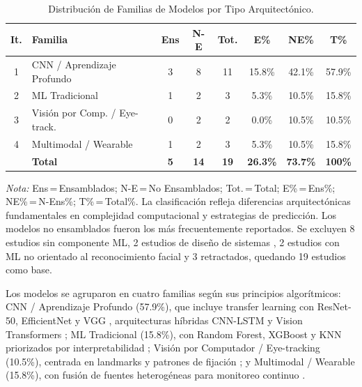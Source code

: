 \documentclass[3p,twocolumn,times]{elsarticle}
\begin{document}
	\begin{table}[!ht]
		\centering
		\caption{Distribución de Familias de Modelos por Tipo Arquitectónico.}\label{tab7}
		\begin{tabular}{clcccccc}
			\toprule
			\textbf{It.} & \textbf{Familia} & \textbf{Ens} & \textbf{N-E} & \textbf{Tot.} &
			\textbf{E\%} & \textbf{NE\%} & \textbf{T\%} \\
			\midrule
			1 & CNN / Aprendizaje Profundo           & 3 & 8  & 11 & 15.8\% & 42.1\% & 57.9\% \\
			2 & ML Tradicional                       & 1 & 2  & 3  & 5.3\%  & 10.5\% & 15.8\% \\
			3 & Visión por Comp. / Eye-track.        & 0 & 2  & 2  & 0.0\%  & 10.5\% & 10.5\% \\
			4 & Multimodal / Wearable                & 1 & 2  & 3  & 5.3\%  & 10.5\% & 15.8\% \\
			& \textbf{Total} & \textbf{5} & \textbf{14} & \textbf{19} &
			\textbf{26.3\%} & \textbf{73.7\%} & \textbf{100\%} \\
			\bottomrule
		\end{tabular}
		\begin{minipage}{\textwidth}
			\vspace{6pt}
			\small\textit{Nota:} Ens\,=\,Ensamblados; N-E\,=\,No Ensamblados; Tot.\,=\,Total;
			E\%\,=\,Ens\%; NE\%\,=\,N-Ens\%; T\%\,=\,Total\%. La clasificación refleja
			diferencias arquitectónicas fundamentales en complejidad computacional y estrategias
			de predicción. Los modelos no ensamblados fueron los más frecuentemente reportados.
			Se excluyen 8 estudios sin componente ML, 2 estudios de diseño de sistemas
			\cite{Levy2024,Almeida2019}, 2 estudios con ML no orientado al reconocimiento facial
			\cite{Alsubai2025,OSullivan2023} y 3 retractados, quedando 19 estudios como base.
		\end{minipage}
	\end{table}
	
	Los modelos se agruparon en cuatro familias según sus principios algorítmicos:
	CNN / Aprendizaje Profundo (57.9\%), que incluye transfer learning con ResNet-50,
	EfficientNet y VGG \cite{Ahmad2024,Radocaj2025}, arquitecturas híbridas CNN-LSTM
	\cite{Aljbori2025,Rhatassi2025} y Vision Transformers \cite{Rhatassi2024,Radocaj2025};
	ML Tradicional (15.8\%), con Random Forest, XGBoost y KNN priorizados por
	interpretabilidad \cite{Hassan2025,AkinBulbul2024}; Visión por Computador /
	Eye-tracking (10.5\%), centrada en landmarks y patrones de fijación
	\cite{Sariyanidi2025,Dapogny2019}; y Multimodal / Wearable (15.8\%), con fusión de
	fuentes heterogéneas para monitoreo continuo \cite{Rudovic2018,Rudovic2019}.
	
\end{document}
